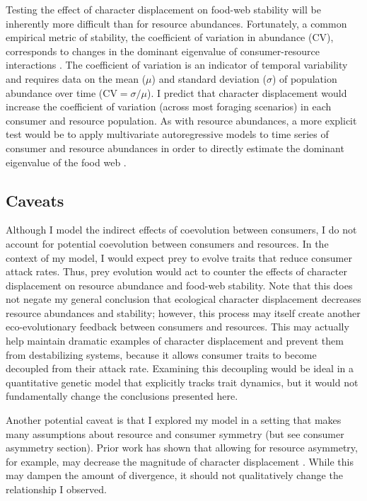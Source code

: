 \documentclass[11pt,]{article}
\begin{document}
Testing the effect of character displacement on food-web stability will
be inherently more difficult than for resource abundances. Fortunately,
a common empirical metric of stability, the coefficient of variation in
abundance (CV), corresponds to changes in the dominant eigenvalue of
consumer-resource interactions \citep{Gellner2016TheorEcol}. The
coefficient of variation is an indicator of temporal variability and
requires data on the mean (\(\mu\)) and standard deviation (\(\sigma\))
of population abundance over time (\(\text{CV}=\sigma/\mu\)). I predict
that character displacement would increase the coefficient of variation
(across most foraging scenarios) in each consumer and resource
population. As with resource abundances, a more explicit test would be
to apply multivariate autoregressive models to time series of consumer
and resource abundances in order to directly estimate the dominant
eigenvalue of the food web \citep[see equation 22 in][]{Ives2003}.

\subsection{Caveats}\label{caveats}

Although I model the indirect effects of coevolution between consumers,
I do not account for potential coevolution between consumers and
resources. In the context of my model, I would expect prey to evolve
traits that reduce consumer attack rates. Thus, prey evolution would act
to counter the effects of character displacement on resource abundance
and food-web stability. Note that this does not negate my general
conclusion that ecological character displacement decreases resource
abundances and stability; however, this process may itself create
another eco-evolutionary feedback between consumers and resources. This
may actually help maintain dramatic examples of character displacement
and prevent them from destabilizing systems, because it allows consumer
traits to become decoupled from their attack rate. Examining this
decoupling would be ideal in a quantitative genetic model that
explicitly tracks trait dynamics, but it would not fundamentally change
the conclusions presented here.

Another potential caveat is that I explored my model in a setting that
makes many assumptions about resource and consumer symmetry (but see
consumer asymmetry section). Prior work has shown that allowing for
resource asymmetry, for example, may decrease the magnitude of character
displacement \citep{Abrams1986}. While this may dampen the amount of
divergence, it should not qualitatively change the relationship I
observed.
\end{document}
